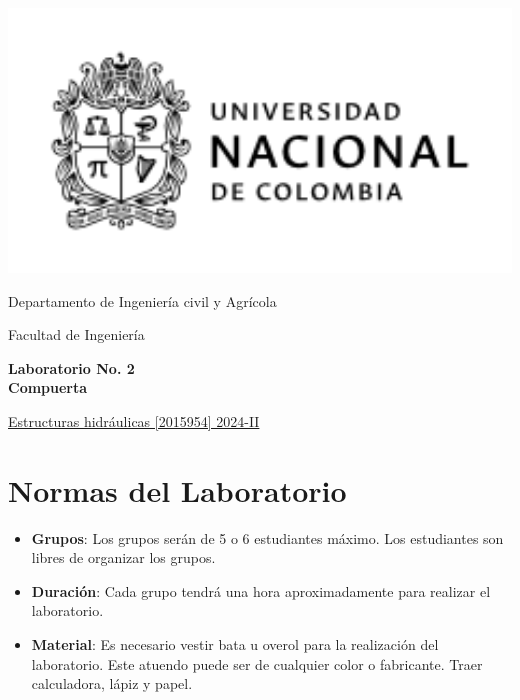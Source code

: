 \documentclass[10pt, a4paper]{exam}
\begin{document}
	\noindent
	\begin{minipage}[l]{0.1\textwidth}
		\noindent
		\includegraphics[width=2.8\textwidth]{ESCUDO.png}
	\end{minipage}
\hfill
\begin{minipage}[c]{0.8\textwidth}
	\begin{center}
		{\large  Departamento de Ingeniería civil y Agrícola\par
		\large	Facultad de Ingeniería	\par
    \large \textbf{Laboratorio No. 2\\Compuerta}	\par
} %
	\end{center}
\end{minipage}
\par
\vspace{0.2in}
\noindent
    \uline{Estructuras hidráulicas [2015954]	\hfill 2024-II	}
\par 
\vspace{0.15in}
\noindent

\section{Normas del Laboratorio}
\begin{itemize}
    \item \textbf{Grupos}: Los grupos serán de 5 o 6 estudiantes máximo. Los estudiantes son libres de organizar los grupos.
    
    \item \textbf{Duración}: Cada grupo tendrá una hora aproximadamente para realizar el laboratorio.
    
    \item \textbf{Material}: Es necesario vestir bata u overol para la realización del laboratorio. Este atuendo puede ser de cualquier color o fabricante. Traer calculadora, lápiz y papel.
\end{itemize}
\end{document}
